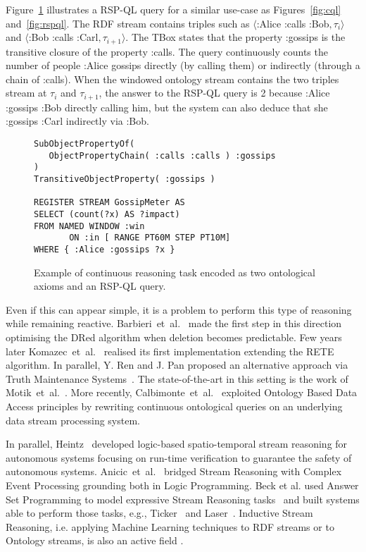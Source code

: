 Figure~\ref{fig:sr} illustrates a RSP-QL query for a similar use-case as Figures~\ref{fig:cql} and~\ref{fig:rspql}. The RDF stream contains triples such as $\langle$\textsf{:Alice :calls :Bob}$,\tau_i\rangle$ and $\langle$\textsf{:Bob :calls :Carl}$,\tau_{i+1}\rangle$. The TBox states that the property \textsf{:gossips} is the transitive closure of the property \textsf{:calls}. The query continuously counts the number of people \textsf{:Alice} gossips directly (by calling them) or indirectly (through a chain of \textsf{:calls}). When the windowed ontology stream contains the two triples stream at $\tau_{i}$ and $\tau_{i+1}$, the answer to the RSP-QL query is 2 because \textsf{:Alice} \textsf{:gossips} \textsf{:Bob} directly calling him, but the system can also deduce that she \textsf{:gossips} \textsf{:Carl} indirectly via \textsf{:Bob}.

\begin{figure}[!h]
\begin{lstlisting}[language=rsp-ql]
SubObjectPropertyOf( 
   ObjectPropertyChain( :calls :calls ) :gossips 
)
TransitiveObjectProperty( :gossips )

REGISTER STREAM GossipMeter AS
SELECT (count(?x) AS ?impact)
FROM NAMED WINDOW :win 
       ON :in [ RANGE PT60M STEP PT10M]
WHERE { :Alice :gossips ?x }
\end{lstlisting}
\vspace*{-4mm}
\caption{\label{fig:sr}Example of continuous reasoning task encoded as two ontological axioms and an RSP-QL query.}
\end{figure}

Even if this can appear simple, it is a problem to perform this type of reasoning while remaining reactive. Barbieri~et~al.~\cite{DBLP:conf/esws/BarbieriBCVG10} made the first step in this direction optimising the DRed algorithm when deletion becomes predictable. Few years later Komazec~et~al.~\cite{DBLP:conf/debs/KomazecCF12} realised its first implementation extending the RETE algorithm. In parallel, Y. Ren and J. Pan proposed an alternative approach via Truth Maintenance Systems~\cite{Ren2011}. The state-of-the-art in this setting is the work of Motik~et~al.~\cite{DBLP:conf/aaai/MotikNPH15a}.  More recently, Calbimonte~et~al.~\cite{DBLP:conf/esws/CalbimonteMC16} exploited Ontology Based Data Access principles by rewriting continuous ontological queries on an underlying data stream processing system.

In parallel, Heintz~\cite{HeintzPhD2009,DeLengHeintz2016AAAI} developed logic-based spatio-temporal stream reasoning for autonomous systems focusing on run-time verification to guarantee the safety of autonomous systems. Anicic~et~al.~\cite{DBLP:journals/semweb/AnicicRFS12} bridged Stream Reasoning with Complex Event Processing grounding both in Logic Programming. Beck et al. used Answer Set Programming to model expressive Stream Reasoning tasks~\cite{DBLP:conf/aaai/BeckDEF15} and built systems able to perform those tasks, e.g.,  Ticker~\cite{DBLP:journals/tplp/BeckEB17} and Laser~\cite{DBLP:conf/semweb/BazoobandiBU17}. 
Inductive Stream Reasoning, i.e. applying Machine Learning techniques to RDF streams or to Ontology streams, is also an active field \cite{DBLP:conf/ijcai/ChenLPC17,DBLP:conf/ijcai/LecueP13,DBLP:journals/expert/BarbieriBCVHTRW10}.

